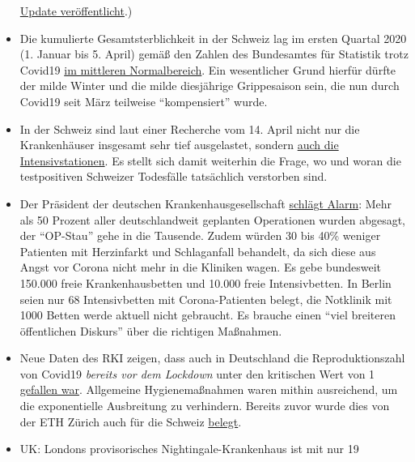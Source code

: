 \begin{itemize}
  \href{https://lockdownsceptics.org/wp-content/uploads/2020/04/Outbreak-continues-in-NYC.pdf}{Update
  veröffentlicht}.)
\item
  Die kumulierte Gesamtsterblichkeit in der Schweiz lag im ersten
  Quartal 2020 (1. Januar bis 5. April) gemäß den Zahlen des Bundesamtes
  für Statistik trotz Covid19
  \href{https://swprs.files.wordpress.com/2020/04/ch-sterblichkeit-kumuliert-q1-2020.pdf}{im
  mittleren Normalbereich}. Ein wesentlicher Grund hierfür dürfte der
  milde Winter und die milde diesjährige Grippesaison sein, die nun
  durch Covid19 seit März teilweise ``kompensiert'' wurde.
\item
  In der Schweiz sind laut einer Recherche vom 14. April nicht nur die
  Krankenhäuser insgesamt sehr tief ausgelastet, sondern
  \href{https://swprs.files.wordpress.com/2020/04/intensivbettenbelegung-schweiz-2020-04-14.png}{auch
  die Intensivstationen}. Es stellt sich damit weiterhin die Frage, wo
  und woran die testpositiven Schweizer Todesfälle tatsächlich
  verstorben sind.
\item
  Der Präsident der deutschen Krankenhausgesellschaft
  \href{https://www.bz-berlin.de/deutschland/kliniken-verband-schlaegt-alarm-wegen-corona-regeln}{schlägt
  Alarm}: Mehr als 50 Prozent aller deutschlandweit geplanten
  Operationen wurden abgesagt, der ``OP-Stau'' gehe in die Tausende.
  Zudem würden 30 bis 40\% weniger Patienten mit Herzinfarkt und
  Schlaganfall behandelt, da sich diese aus Angst vor Corona nicht mehr
  in die Kliniken wagen. Es gebe bundesweit 150.000 freie
  Krankenhausbetten und 10.000 freie Intensivbetten. In Berlin seien nur
  68 Intensivbetten mit Corona-Patienten belegt, die Notklinik mit 1000
  Betten werde aktuell nicht gebraucht. Es brauche einen ``viel
  breiteren öffentlichen Diskurs'' über die richtigen Maßnahmen.
\item
  Neue Daten des RKI zeigen, dass auch in Deutschland die
  Reproduktionszahl von Covid19 \emph{bereits vor dem Lockdown} unter
  den kritischen Wert von 1
  \href{https://www.rki.de/DE/Content/Infekt/EpidBull/Archiv/2020/Ausgaben/17_20_SARS-CoV2_vorab.pdf?__blob=publicationFile\#page=5}{gefallen
  war}. Allgemeine Hygiene­maß­nahmen waren mithin ausreichend, um die
  exponentielle Ausbreitung zu verhindern. Bereits zuvor wurde dies von
  der ETH Zürich auch für die Schweiz
  \href{https://www.tagesanzeiger.ch/ansteckungsraten-flachten-bereits-vor-dem-lockdown-ab-809893127675}{belegt}.
\item
  UK: Londons provisorisches Nightingale-Krankenhaus ist mit nur 19

\end{itemize}
